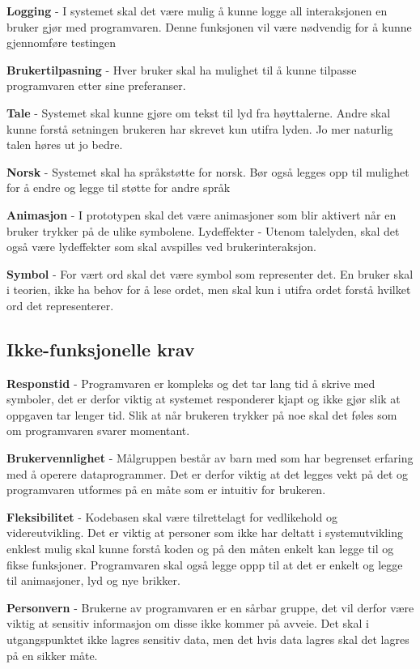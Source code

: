 \textbf{Logging} - I systemet skal det være mulig å kunne logge all interaksjonen en bruker gjør med programvaren. Denne funksjonen vil være nødvendig for å kunne gjennomføre testingen 
 
 
\textbf{Brukertilpasning} - Hver bruker skal ha mulighet til å kunne tilpasse programvaren etter sine preferanser. 
  
\textbf{Tale} - Systemet skal kunne gjøre om tekst til lyd fra høyttalerne. Andre skal kunne forstå setningen brukeren har skrevet kun utifra lyden. Jo mer naturlig talen høres ut jo bedre.
  
\textbf{Norsk} - Systemet skal ha språkstøtte for norsk. Bør også legges opp til mulighet for å endre og legge til støtte for andre språk 
 
\textbf{Animasjon} - I prototypen skal det være animasjoner som blir aktivert når en bruker trykker på de ulike symbolene.  
Lydeffekter - Utenom talelyden, skal det også være lydeffekter som skal avspilles ved brukerinteraksjon.  
 
\textbf{Symbol} - For vært ord skal det være symbol som representer det. En bruker skal i teorien, ikke ha behov for å lese ordet, men skal kun i utifra ordet forstå hvilket ord det representerer. 


 
\subsection{Ikke-funksjonelle krav} 
 
 
\textbf{Responstid} -  Programvaren er kompleks og det tar lang tid å skrive med symboler, det er derfor viktig at systemet responderer kjapt og ikke gjør slik at oppgaven tar lenger tid. Slik at når brukeren trykker på noe skal det føles som om programvaren svarer momentant. 
 
 
\textbf{Brukervennlighet} - Målgruppen består av barn med som har begrenset erfaring med å operere dataprogrammer. Det er derfor viktig at det legges vekt på det og programvaren utformes på en måte som er intuitiv for brukeren.   
 
 
\textbf{Fleksibilitet} - Kodebasen skal være tilrettelagt for vedlikehold og videreutvikling. Det er viktig at personer som ikke har deltatt i systemutvikling enklest mulig skal kunne forstå koden og på den måten enkelt kan legge til og fikse funksjoner. Programvaren skal også legge oppp til at det er enkelt og legge til animasjoner, lyd og nye brikker. 
 
\textbf{Personvern} - Brukerne av programvaren er en sårbar gruppe, det vil derfor være viktig at sensitiv informasjon om disse ikke kommer på avveie. Det skal i utgangspunktet ikke lagres sensitiv data, men det hvis data lagres skal det lagres på en sikker måte. 
 
